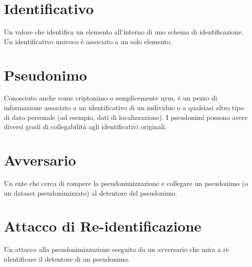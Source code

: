 \section*{Identificativo}
Un valore che identifica un elemento all'interno di uno schema di identificazione. Un identificativo univoco è associato a un solo elemento.

\section*{Pseudonimo}
Conosciuto anche come criptonimo o semplicemente nym, è un pezzo di informazione associato a un identificativo di un individuo o a qualsiasi altro tipo di dato personale (ad esempio, dati di localizzazione). I pseudonimi possono avere diversi gradi di collegabilità agli identificativi originali.

\section*{Avversario}
Un ente che cerca di rompere la pseudonimizzazione e collegare un pseudonimo (o un dataset pseudonimizzato) al detentore del pseudonimo.

\section*{Attacco di Re-identificazione}
Un attacco alla pseudonimizzazione eseguito da un avversario che mira a ri-identificare il detentore di un pseudonimo.
